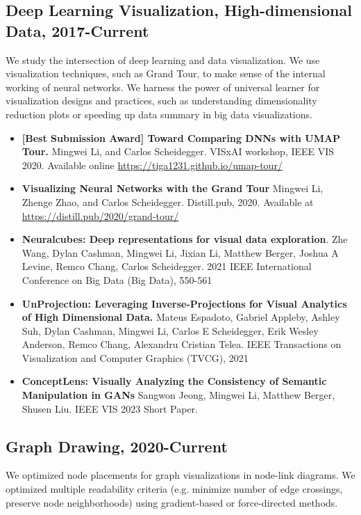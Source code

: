 \documentclass[letterpaper,11pt,oneside]{article}
\begin{document}
\subsection*{Deep Learning Visualization, High-dimensional Data, 2017-Current}
We study the intersection of deep learning and data visualization. 
    We use visualization techniques, such as Grand Tour, to make sense of the internal working of neural networks. 
    We harness the power of universal learner for visualization designs and practices, such as understanding dimensionality reduction plots or speeding up data summary in big data visualizations.
    \begin{itemize}
        \item \textbf{[Best Submission Award] Toward Comparing DNNs with UMAP Tour. }
            Mingwei Li, and Carlos Scheidegger. 
            VISxAI workshop, IEEE VIS 2020. Available online \url{https://tiga1231.github.io/umap-tour/}
        \item \textbf{Visualizing Neural Networks with the Grand Tour}
            Mingwei Li, Zhenge Zhao, and Carlos Scheidegger.
            Distill.pub, 2020. Available at \url{https://distill.pub/2020/grand-tour/}
        \item \textbf{Neuralcubes: Deep representations for visual data exploration}. 
            Zhe Wang, Dylan Cashman, Mingwei Li, Jixian Li, Matthew Berger, Joshua A Levine, Remco Chang, Carlos Scheidegger. 
            2021 IEEE International Conference on Big Data (Big Data), 550-561
        \item \textbf{UnProjection: Leveraging Inverse-Projections for Visual Analytics of High Dimensional Data.}
            Mateus Espadoto, Gabriel Appleby, Ashley Suh, Dylan Cashman, Mingwei Li, Carlos E Scheidegger, Erik Wesley Anderson, Remco Chang, Alexandru Cristian Telea. 
            IEEE Transactions on Visualization and Computer Graphics (TVCG), 2021
        \item \textbf{ConceptLens: Visually Analyzing the Consistency of Semantic Manipulation in GANs}
            Sangwon Jeong, Mingwei Li, Matthew Berger, Shusen Liu.
            IEEE VIS 2023 Short Paper.

    \end{itemize}


\subsection*{Graph Drawing, 2020-Current}
We optimized node placements for graph visualizations in node-link diagrams. 
We optimized multiple readability criteria (e.g. minimize number of edge crossings, preserve node neighborhoods) using gradient-based or force-directed methods. 
\end{document}
